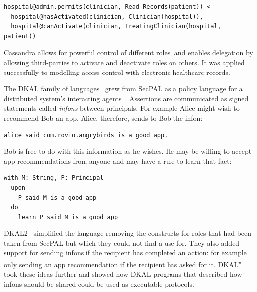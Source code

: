 \documentclass[thesis.tex]{subfiles}
\begin{document}
\begin{lstlisting}
hospital@admin.permits(clinician, Read-Records(patient)) <-
  hospital@hasActivated(clinician, Clinician(hospital)),
  hospital@canActivate(clinician, TreatingClinician(hospital, patient))
\end{lstlisting}

Cassandra allows for powerful control of different roles, and enables
delegation by allowing third-parties to activate and deactivate roles
on others.  It was applied successfully to modelling access control
with electronic healthcare records.

The DKAL family of
languages~\cite{jeannin_dkal*:_2013,gurevich_dkal:_2008,yuri_gurevich_dkal2---simplified_2009}
grew from SecPAL as a policy language for a distributed
system's interacting agents~\cite{blass_introduction_2012}. Assertions are
communicated as signed statements called \emph{infons} between principals. For
example Alice might wish to recommend Bob an app. Alice, therefore, sends to Bob
the infon:

\begin{lstlisting}
alice said com.rovio.angrybirds is a good app.
\end{lstlisting}

Bob is free to do with this information as he wishes.  He may be
willing to accept app recommendations from anyone and may have a rule
to learn that fact:

\begin{lstlisting}
with M: String, P: Principal
  upon
    P said M is a good app
  do
    learn P said M is a good app
\end{lstlisting}

DKAL2~\cite{yuri_gurevich_dkal2---simplified_2009} simplified the
language removing the constructs for roles that had been taken from
SecPAL but which they could not find a use for.  They also added
support for sending infons if the recipient has completed an action:
for example only sending an app recommendation if the recipient has
asked for it.
DKAL\textsuperscript{$\star$}~\cite{jeannin_dkal*:_2013} took these
ideas further and showed how DKAL programs that described how infons
should be shared could be used as executable protocols.
\end{document}
